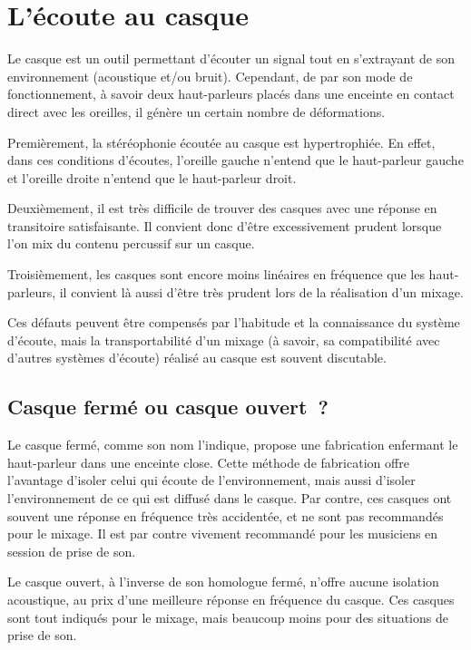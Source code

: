 \documentclass[
  letterpaper,
  DIV=11,
  numbers=noendperiod]{scrreprt}
\begin{document}
\hypertarget{luxe9coute-au-casque}{%
\section{L'écoute au casque}\label{luxe9coute-au-casque}}

Le casque est un outil permettant d'écouter un signal tout en
s'extrayant de son environnement (acoustique et/ou bruit). Cependant, de
par son mode de fonctionnement, à savoir deux haut-parleurs placés dans
une enceinte en contact direct avec les oreilles, il génère un certain
nombre de déformations.

Premièrement, la stéréophonie écoutée au casque est hypertrophiée. En
effet, dans ces conditions d'écoutes, l'oreille gauche n'entend que le
haut-parleur gauche et l'oreille droite n'entend que le haut-parleur
droit.

Deuxièmement, il est très difficile de trouver des casques avec une
réponse en transitoire satisfaisante. Il convient donc d'être
excessivement prudent lorsque l'on mix du contenu percussif sur un
casque.

Troisièmement, les casques sont encore moins linéaires en fréquence que
les haut-parleurs, il convient là aussi d'être très prudent lors de la
réalisation d'un mixage.

Ces défauts peuvent être compensés par l'habitude et la connaissance du
système d'écoute, mais la transportabilité d'un mixage (à savoir, sa
compatibilité avec d'autres systèmes d'écoute) réalisé au casque est
souvent discutable.

\hypertarget{casque-fermuxe9-ou-casque-ouvert}{%
\subsection{Casque fermé ou casque
ouvert~?}\label{casque-fermuxe9-ou-casque-ouvert}}

Le casque fermé, comme son nom l'indique, propose une fabrication
enfermant le haut-parleur dans une enceinte close. Cette méthode de
fabrication offre l'avantage d'isoler celui qui écoute de
l'environnement, mais aussi d'isoler l'environnement de ce qui est
diffusé dans le casque. Par contre, ces casques ont souvent une réponse
en fréquence très accidentée, et ne sont pas recommandés pour le mixage.
Il est par contre vivement recommandé pour les musiciens en session de
prise de son.

Le casque ouvert, à l'inverse de son homologue fermé, n'offre aucune
isolation acoustique, au prix d'une meilleure réponse en fréquence du
casque. Ces casques sont tout indiqués pour le mixage, mais beaucoup
moins pour des situations de prise de son.
\end{document}
